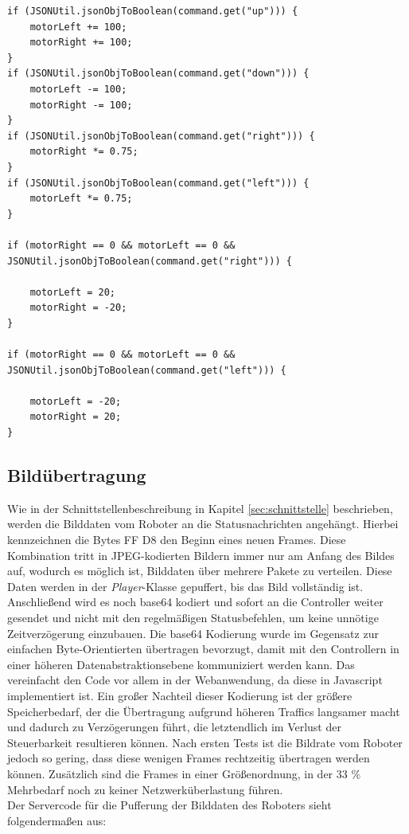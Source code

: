 \begin{lstlisting}
if (JSONUtil.jsonObjToBoolean(command.get("up"))) {
	motorLeft += 100;
	motorRight += 100;
}
if (JSONUtil.jsonObjToBoolean(command.get("down"))) {
	motorLeft -= 100;
	motorRight -= 100;
}
if (JSONUtil.jsonObjToBoolean(command.get("right"))) {
	motorRight *= 0.75;
}
if (JSONUtil.jsonObjToBoolean(command.get("left"))) {
	motorLeft *= 0.75;
} 

if (motorRight == 0 && motorLeft == 0 &&
JSONUtil.jsonObjToBoolean(command.get("right"))) {

	motorLeft = 20;
	motorRight = -20;
}

if (motorRight == 0 && motorLeft == 0 &&
JSONUtil.jsonObjToBoolean(command.get("left"))) {

	motorLeft = -20;
	motorRight = 20;
}
\end{lstlisting}
 

\subsection{Bildübertragung}
Wie in der Schnittstellenbeschreibung in Kapitel \ref{sec:schnittstelle} beschrieben, werden die Bilddaten vom Roboter an die Statusnachrichten angehängt. Hierbei kennzeichnen die Bytes FF D8 den Beginn eines neuen Frames. Diese Kombination tritt in JPEG-kodierten Bildern immer nur am Anfang des Bildes auf, wodurch es möglich ist, Bilddaten über mehrere Pakete zu verteilen. Diese Daten werden in der \textit{Player}-Klasse gepuffert, bis das Bild vollständig ist. Anschließend wird es noch base64 kodiert und sofort an die Controller weiter gesendet und nicht mit den regelmäßigen Statusbefehlen, um keine unnötige Zeitverzögerung einzubauen. Die base64 Kodierung wurde im Gegensatz zur einfachen Byte-Orientierten übertragen bevorzugt, damit mit den Controllern in einer höheren Datenabstraktionsebene kommuniziert werden kann. Das vereinfacht den Code vor allem in der Webanwendung, da diese in Javascript implementiert ist. Ein großer Nachteil dieser Kodierung ist der größere Speicherbedarf, der die Übertragung aufgrund höheren Traffics langsamer macht und dadurch zu Verzögerungen führt, die letztendlich im Verlust der Steuerbarkeit resultieren können. Nach ersten Tests ist die Bildrate vom Roboter jedoch so gering, dass diese wenigen Frames rechtzeitig übertragen werden können. Zusätzlich sind die Frames in einer Größenordnung, in der 33 \% Mehrbedarf noch zu keiner Netzwerküberlastung führen.\\ Der Servercode für die Pufferung der Bilddaten des Roboters sieht folgendermaßen aus:

